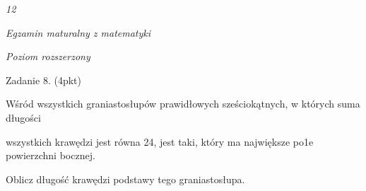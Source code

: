 \documentclass[a4paper,12pt]{article}
\begin{document}
{\it 12}

{\it Egzamin maturalny z matematyki}

{\it Poziom rozszerzony}

Zadanie 8. (4pkt)

Wśród wszystkich graniastosłupów prawidłowych sześciokątnych, w których suma długości

wszystkich krawędzi jest równa 24, jest taki, który ma największe po1e powierzchni bocznej.

Oblicz długość krawędzi podstawy tego graniastosłupa.
\end{document}
